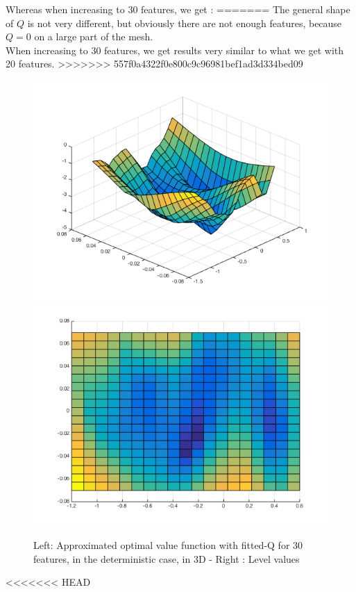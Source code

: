 \documentclass[a4paper, 12pt]{article}
\begin{document}
Whereas when increasing to 30 features, we get :
=======
The general shape of $Q$ is not very different, but obviously there are not enough features, because $Q=0$ on a large part of the mesh. 
\\When increasing to 30 features, we get results very similar to what we get with 20 features.
>>>>>>> 557f0a4322f0e800c9c96981bef1ad3d334bed09
\begin{figure}[H]
	\centering
	\noindent\includegraphics[scale=0.3]{fittedQ-30feat-determ.png}
	\noindent\includegraphics[scale=0.3]{fittedQ-30feat-determ-flat.png}
	\caption{Left: Approximated optimal value function with fitted-Q for 30 features, in the deterministic case, in 3D - Right : Level values}
\end{figure}
<<<<<<< HEAD
\end{document}
